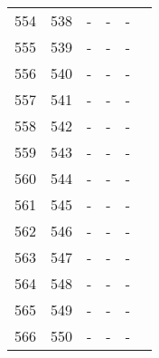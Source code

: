 \begin{longtable}{rrrrrr}
  554 & 538 & - & - & - &  \\ 
  555 & 539 & - & - & - &  \\ 
  556 & 540 & - & - & - &  \\ 
  557 & 541 & - & - & - &  \\ 
  558 & 542 & - & - & - &  \\ 
  559 & 543 & - & - & - &  \\ 
  560 & 544 & - & - & - &  \\ 
  561 & 545 & - & - & - &  \\ 
  562 & 546 & - & - & - &  \\ 
  563 & 547 & - & - & - &  \\ 
  564 & 548 & - & - & - &  \\ 
  565 & 549 & - & - & - &  \\ 
  566 & 550 & - & - & - &  \\ 
   \hline
\hline
\end{longtable}
